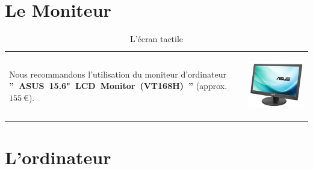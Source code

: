 \documentclass[12pt, a4paper]{article}
\newcommand{\money}[1]{$#1\ \euro{}$\xspace}
\begin{document}
\vspace{-0.2em}
\section{Le Moniteur}
\vspace{-4.2em}

\begin{table}[!htbp]
\begin{tabular}{lr}
\parbox{25em}{
Nous recommandons l'utilisation du
moniteur d'ordinateur
\textbf{''~ASUS~15.6"~LCD~Monitor~(VT168H)~''}
(approx.~\money{155}).
\vspace{-3em}
}

&

\parbox{17em}{
\begin{center}
\includegraphics[scale=0.14]{images/asus-15_6-lcd-monitor.png}
\caption*{L'\'ecran tactile}
\end{center}
}
\end{tabular}
\end{table}

\vspace{-0.3em}
\section{L'ordinateur}
\vspace{-4.2em}
\end{document}
